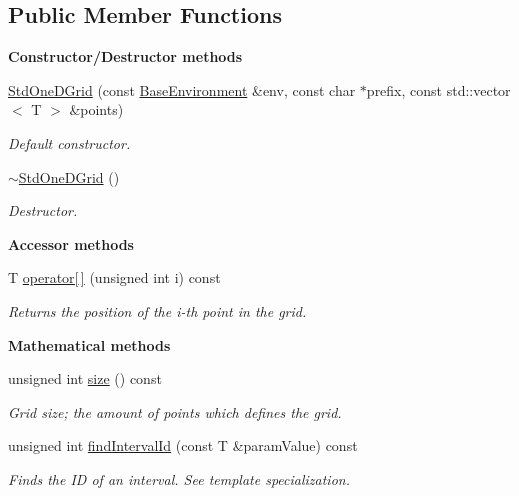 \subsection*{Public Member Functions}
\begin{Indent}{\bf Constructor/\-Destructor methods}\par
\begin{DoxyCompactItemize}
\item 
\hyperlink{class_q_u_e_s_o_1_1_std_one_d_grid_abc4d171b8f9df81014b10ac86e84b3b2}{Std\-One\-D\-Grid} (const \hyperlink{class_q_u_e_s_o_1_1_base_environment}{Base\-Environment} \&env, const char $\ast$prefix, const std\-::vector$<$ T $>$ \&points)
\begin{DoxyCompactList}\small\item\em Default constructor. \end{DoxyCompactList}\item 
\hyperlink{class_q_u_e_s_o_1_1_std_one_d_grid_ab001d3cccbda4c4c288e5f6a3e398574}{$\sim$\-Std\-One\-D\-Grid} ()
\begin{DoxyCompactList}\small\item\em Destructor. \end{DoxyCompactList}\end{DoxyCompactItemize}
\end{Indent}
\begin{Indent}{\bf Accessor methods}\par
\begin{DoxyCompactItemize}
\item 
T \hyperlink{class_q_u_e_s_o_1_1_std_one_d_grid_a08cb60749c59ff27239c231d6a0f1eca}{operator\mbox{[}$\,$\mbox{]}} (unsigned int i) const 
\begin{DoxyCompactList}\small\item\em Returns the position of the i-\/th point in the grid. \end{DoxyCompactList}\end{DoxyCompactItemize}
\end{Indent}
\begin{Indent}{\bf Mathematical methods}\par
\begin{DoxyCompactItemize}
\item 
unsigned int \hyperlink{class_q_u_e_s_o_1_1_std_one_d_grid_a006574772a0021d68c6f5c98e2db3458}{size} () const 
\begin{DoxyCompactList}\small\item\em Grid size; the amount of points which defines the grid. \end{DoxyCompactList}\item 
unsigned int \hyperlink{class_q_u_e_s_o_1_1_std_one_d_grid_aaf32f8fe97724ad2d23d5be9b2faeaae}{find\-Interval\-Id} (const T \&param\-Value) const 
\begin{DoxyCompactList}\small\item\em Finds the I\-D of an interval. See template specialization. \end{DoxyCompactList}\end{DoxyCompactItemize}
\end{Indent}
